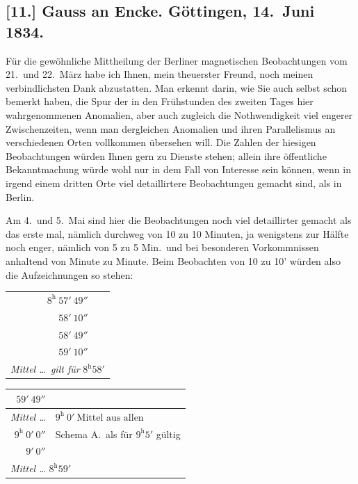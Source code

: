 \documentclass[12pt,a4paper]{article}
\begin{document}
\subsection*{[11.] Gauss an Encke. G\"ottingen, 14.~Juni 1834.}

F\"ur die gew\"ohnliche Mittheilung der Berliner magnetischen Beobachtungen vom 21.~und 22.~M\"arz habe ich Ihnen, mein theuerster Freund, noch meinen verbindlichsten Dank abzustatten. Man erkennt darin, wie Sie auch selbst schon bemerkt haben, die Spur der in den Fr\"uhstunden des zweiten Tages hier wahrgenommenen Anomalien, aber auch zugleich die Nothwendigkeit viel engerer Zwischenzeiten, wenn man dergleichen Anomalien und ihren Parallelismus an verschiedenen Orten vollkommen \"ubersehen will. Die Zahlen der hiesigen Beobachtungen w\"urden Ihnen gern zu Dienste stehen; allein ihre \"offentliche Bekanntmachung w\"urde wohl nur in dem Fall von Interesse sein k\"onnen, wenn in irgend einem dritten Orte viel detaillirtere Beobachtungen gemacht sind, als in Berlin.

Am 4.~und 5.~Mai sind hier die Beobachtungen noch viel detaillirter gemacht als das erste mal, n\"amlich durchweg von 10 zu 10 Minuten, ja wenigstens zur H\"alfte noch enger, n\"amlich von 5 zu 5 Min.~und bei besonderen Vorkommnissen anhaltend von Minute zu Minute. Beim Beobachten von 10 zu 10' w\"urden also die Aufzeichnungen so stehen:

\begin{center}
\begin{tabular}{r@{\ }l}
$8^{\mathrm{h}}\ 57'\ 49''$ & \\
$58'\ 10''$ & \\
$58'\ 49''$ & \\
$59'\ 10''$ & \\
\hline
\multicolumn{2}{l}{\textit{Mittel \ldots\ gilt f\"ur} $8^{\mathrm{h}} 58'$}
\end{tabular}
\end{center}

\begin{center}
\begin{tabular}{r@{\ }l}
$59'\ 49''$ & \\
\hline
\textit{Mittel \ldots} & $9^{\mathrm{h}}\ 0'\ \text{Mittel aus allen}$ \\
$9^{\mathrm{h}}\ 0'\ 0''$ & Schema A.~als f\"ur $9^{\mathrm{h}} 5'$ g\"ultig \\
$9'\ 0''$ & \\
\multicolumn{2}{l}{\textit{Mittel \ldots} $8^{\mathrm{h}} 59'$}
\end{tabular}
\end{center}
\end{document}
